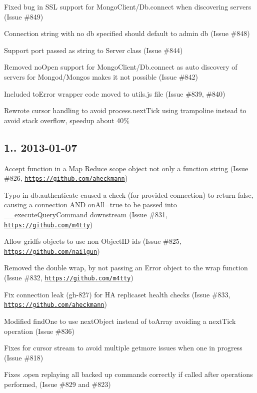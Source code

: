 \begin{DoxyItemize}
\item Fixed bug in S\+SL support for Mongo\+Client/\+Db.\+connect when discovering servers (Issue \#849)
\item Connection string with no db specified should default to admin db (Issue \#848)
\item Support port passed as string to Server class (Issue \#844)
\item Removed no\+Open support for Mongo\+Client/\+Db.\+connect as auto discovery of servers for Mongod/\+Mongos makes it not possible (Issue \#842)
\item Included to\+Error wrapper code moved to utils.\+js file (Issue \#839, \#840)
\item Rewrote cursor handling to avoid process.\+next\+Tick using trampoline instead to avoid stack overflow, speedup about 40\%
\end{DoxyItemize}

\subsection*{1.. 2013-\/01-\/07 }


\begin{DoxyItemize}
\item Accept function in a Map Reduce scope object not only a function string (Issue \#826, \href{https://github.com/aheckmann}{\tt https\+://github.\+com/aheckmann})
\item Typo in db.\+authenticate caused a check (for provided connection) to return false, causing a connection A\+ND on\+All=true to be passed into \+\_\+\+\_\+execute\+Query\+Command downstream (Issue \#831, \href{https://github.com/m4tty}{\tt https\+://github.\+com/m4tty})
\item Allow gridfs objects to use non Object\+ID ids (Issue \#825, \href{https://github.com/nailgun}{\tt https\+://github.\+com/nailgun})
\item Removed the double wrap, by not passing an Error object to the wrap function (Issue \#832, \href{https://github.com/m4tty}{\tt https\+://github.\+com/m4tty})
\item Fix connection leak (gh-\/827) for HA replicaset health checks (Issue \#833, \href{https://github.com/aheckmann}{\tt https\+://github.\+com/aheckmann})
\item Modified find\+One to use next\+Object instead of to\+Array avoiding a next\+Tick operation (Issue \#836)
\item Fixes for cursor stream to avoid multiple getmore issues when one in progress (Issue \#818)
\item Fixes .open replaying all backed up commands correctly if called after operations performed, (Issue \#829 and \#823)
\end{DoxyItemize}

